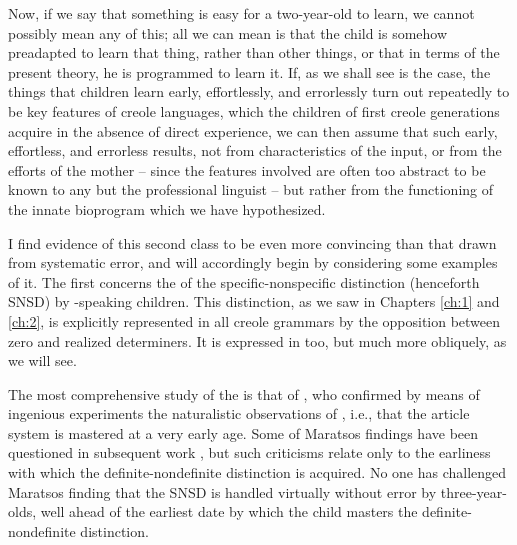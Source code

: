 Now, if we say that something is easy for a two-year-old to learn, we cannot possibly mean any of this; all we can mean is that the child is somehow preadapted to learn that thing, rather than other things, or that in terms of the present theory, he is programmed to learn it. If, as we shall see is the case, the things that children learn early, effortlessly, and errorlessly turn out repeatedly to be key features of creole languages, which the children of first creole generations acquire in the absence of direct experience, we can then assume that such early, effortless, and errorless  results, not from characteristics of the input, or from the efforts of the mother -- since the features involved are often too abstract to be known to any but the professional linguist -- but rather from the functioning of the innate bioprogram which we have hypothesized.

I find evidence of this second class to be even more convincing than that drawn from systematic error, and will accordingly begin by considering some examples of it. The first concerns the  of the specific-nonspecific distinction (henceforth SNSD) by -speaking children. This distinction, as we saw in Chapters \ref{ch:1} and \ref{ch:2}, is explicitly represented in all creole grammars by the opposition
between zero and realized determiners. It is expressed in  too, but much more obliquely, as we will see.

The most comprehensive study of the    is that of \citet{Maratsos1974,Maratsos1976}, who confirmed by means of ingenious experiments the naturalistic observations of \citet{Brown1973}, i.e., that the article system is mastered at a very early age. Some of Maratsos findings have been questioned in subsequent work \citep{Warden1976,Karmiloff-Smith1979}, but such criticisms relate only to the earliness with which the definite-nondefinite distinction is acquired. No one has challenged Maratsos finding that the SNSD is handled virtually without error by three-year-olds, well ahead of the earliest date by which the child masters the definite-nondefinite distinction.

